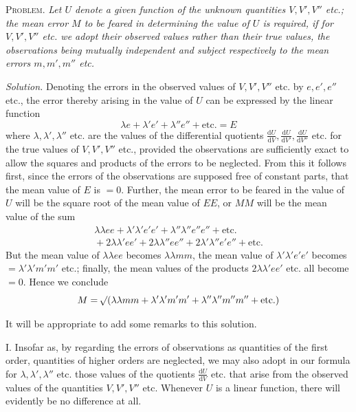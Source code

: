 \textsc{Problem.} \textit{Let \(U\) denote a given function of the unknown quantities \(V,V',V''\) etc.; the mean error \(M\) to be feared in determining the value of \(U\) is required, if for \(V,V',V''\) etc. we adopt their observed values rather than their true values, the observations being mutually independent and subject respectively to the mean errors \(m,m',m''\) etc.}

\textit{Solution.} Denoting the errors in the observed values of \(V,V',V''\) etc. by \(e,e',e''\) etc., the error thereby arising in the value of \(U\) can be expressed by the linear function
\[
\lambda e+\lambda'e'+\lambda''e''+\text{etc.}=E
\]
where \(\lambda,\lambda',\lambda''\) etc. are the values of the differential quotients \(\frac{\mathrm{d}U}{\mathrm{d}V},\frac{\mathrm{d}U}{\mathrm{d}V'},\frac{\mathrm{d}U}{\mathrm{d}V''}\) etc. for the true values of \(V,V',V''\) etc., provided the observations are sufficiently exact to allow the squares and products of the errors to be neglected. From this it follows first, since the errors of the observations are supposed free of constant parts, that the mean value of \(E\) is \(=0\). Further, the mean error to be feared in the value of \(U\) will be the square root of the mean value of \(EE\), or \(MM\) will be the mean value of the sum
\[
\begin{aligned}
\lambda\lambda ee+\lambda'\lambda'e'e'+\lambda''\lambda''e''e''+\text{etc.}{}\\
{}+2\lambda\lambda'ee'+2\lambda\lambda''ee''+2\lambda'\lambda''e'e''+\text{etc.}
\end{aligned}
\]
But the mean value of \(\lambda\lambda ee\) becomes \(\lambda\lambda mm\), the mean value of \(\lambda'\lambda'e'e'\) becomes \(=\lambda'\lambda'm'm'\) etc.; finally, the mean values of the products \(2\lambda\lambda'ee'\) etc. all become \(=0\). Hence we conclude
\[
M=\mathord{{}^{}\!\surd}(\lambda\lambda mm+\lambda'\lambda'm'm'+\lambda''\lambda''m''m''+\text{etc.})
\]
\par
It will be appropriate to add some remarks to this solution.

I. Insofar as, by regarding the errors of observations as quantities of the first order, quantities of higher orders are neglected, we may also adopt in our formula for \(\lambda,\lambda',\lambda''\) etc. those values of the quotients \(\frac{\mathrm{d}U}{\mathrm{d}V}\) etc. that arise from the observed values of the quantities \(V,V',V''\) etc. Whenever \(U\) is a linear function, there will evidently be no difference at all.

